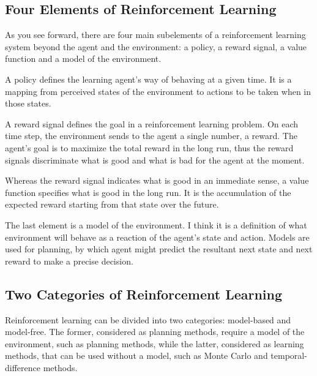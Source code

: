 \documentclass[10pt,twocolumn,letterpaper]{article}
\begin{document}
\subsection{Four Elements of Reinforcement Learning}

As you see forward, there are four main subelements of a reinforcement learning system beyond the agent
and the environment: a policy, a reward signal, a value function and a model of the environment.

A policy defines the learning agent's way of behaving at a given time. It is a mapping from perceived states of
the environment to actions to be taken when in those states.

 A reward signal defines the goal in a reinforcement learning problem. On each time step, the environment sends
 to the agent a single number, a reward. The agent's goal is to maximize the total reward in the long run, thus the
 reward signals discriminate what is good and what is bad for the agent at the moment.
 
 Whereas the reward signal indicates what is good in an immediate sense, a value function specifies what is good 
 in the long run. It is the accumulation of the expected reward starting from that state over the future.
 
 The last element is a model of the environment. I think it is a definition of what environment will behave as a reaction
 of the agent's state and action. Models are used for planning, by which agent might predict the resultant next state and
 next reward to make a precise decision. 
 
\subsection{Two Categories of Reinforcement Learning}

Reinforcement learning can be divided into two categories: model-based and model-free. The former, considered as 
planning methods, require a model of the environment, such as planning methods, while the latter, considered as learning
methods, that can be used without a  model, such as Monte Carlo and temporal-difference methods.  
\end{document}
